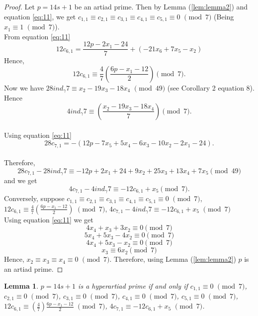 \documentclass[a4paper,12pt]{article}
\newtheorem{lemma}{Lemma}[section]
\def\vpmod{\!\!\!\pmod}
\begin{document}
\begin{proof}
Let $p=14s+1$ be an artiad prime. Then by Lemma (\ref{lem:lemma2}) and equation \eqref{eq:11}, we get $c_{1,1}\equiv c_{2,1}\equiv c_{3,1}\equiv c_{4,1}\equiv c_{5,1}\equiv 0\,\,\vpmod 7$
(Being $x_{1}\equiv 1\,\,\vpmod 7$).\\
From equation \eqref{eq:11} $$12c_{6,1}=\frac{12p-2x_{1}-24}{7}+(-21x_{6}+7x_{5}-x_{2})$$
Hence, $$12c_{6,1}\equiv\frac{4}{7}(\frac{6p-x_{1}-12}{2})\vpmod 7.$$
Now we have $28ind_{\gamma}7\equiv x_{2}-19x_{3}-18x_{4}\,\,\vpmod {49}$ (see \cite{16} Corollary 2 equation 8).\\
Hence $$4ind_{\gamma}7\equiv(\frac{x_{2}-19x_{3}-18x_{4}}{7})\vpmod 7.$$\\
Using equation \eqref{eq:11} $$28c_{7,1}=-(12p-7x_{5}+5x_{4}-6x_{3}-10x_{2}-2x_{1}-24).$$\\
Therefore, $$28c_{7,1}-28ind_{\gamma}7\equiv-12p+2x_{1}+24+9x_{2}+25x_{3}+13x_{4}+7x_{5}\vpmod {49}$$ and we get 
$$4c_{7,1}-4ind_{\gamma}7\equiv-12c_{6,1}+x_{5}\vpmod 7.$$
\indent Conversely, suppose $c_{1,1}\equiv c_{2,1}\equiv c_{3,1}\equiv c_{4,1}\equiv c_{5,1}\equiv 0\,\,\vpmod 7$,
   $12c_{6,1}\equiv\frac{4}{7}(\frac{6p-x_{1}-12}{2})\,\,\vpmod 7$, $4c_{7,1}-4ind_{\gamma}7\equiv-12c_{6,1}+x_{5}\,\,\vpmod 7$\\
Using equation \eqref{eq:11} we get
\begin{equation*}\label{eq:16}
  4x_{4}+x_{3}+3x_{2}\equiv 0\vpmod7
  \end{equation*}
  \begin{equation*}\label{eq:17}
  5x_{4}+5x_{3}-4x_{2}\equiv 0\vpmod7
  \end{equation*}
  \begin{equation*}\label{eq:18}
  4x_{4}+5x_{3}-x_{2}\equiv 0\vpmod7
  \end{equation*}
  \begin{equation*}\label{eq:19}
   x_{3}\equiv 6x_{2}\vpmod7
\end{equation*}
Hence, $x_{2}\equiv x_{3}\equiv x_{4}\equiv 0\,\,\vpmod 7$. Therefore, using Lemma (\ref{lem:lemma2}) $p$ is an artiad prime.
\end{proof}
\begin{lemma}\label{lem:lemma5}
$p=14s+1$ is a hyperartiad prime if and only if $c_{1,1}\equiv 0\,\,\vpmod 7$, $c_{2,1}\equiv 0\,\,\vpmod 7$, $c_{3,1}\equiv 0\,\,\vpmod 7$, $c_{4,1}\equiv 0\,\,\vpmod 7$, $c_{5,1}\equiv 0\,\, \vpmod 7$,
$12c_{6,1}\equiv (\frac{4}{7})\frac{6p-x_{1}-12}{2}\,\,\vpmod 7$, $4c_{7,1}\equiv -12c_{6,1}+x_{5}\,\,\vpmod 7$.
\end{lemma}
\end{document}
